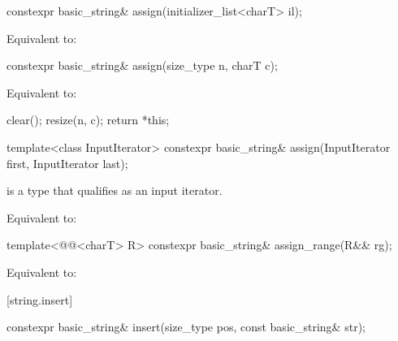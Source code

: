 %
\begin{itemdecl}
constexpr basic_string& assign(initializer_list<charT> il);
\end{itemdecl}

\begin{itemdescr}
\pnum
\effects
Equivalent to: 
\end{itemdescr}

%
\begin{itemdecl}
constexpr basic_string& assign(size_type n, charT c);
\end{itemdecl}

\begin{itemdescr}
\pnum
\effects
Equivalent to:
\begin{codeblock}
clear();
resize(n, c);
return *this;
\end{codeblock}
\end{itemdescr}

%
\begin{itemdecl}
template<class InputIterator>
  constexpr basic_string& assign(InputIterator first, InputIterator last);
\end{itemdecl}

\begin{itemdescr}
\pnum
\constraints
{} is a type that qualifies as an input
iterator.

\pnum
\effects
Equivalent to: 
\end{itemdescr}

%
\begin{itemdecl}
template<@@<charT> R>
  constexpr basic_string& assign_range(R&& rg);
\end{itemdecl}

\begin{itemdescr}
\pnum
\effects
Equivalent to: 
\end{itemdescr}

[string.insert]{}

%
\begin{itemdecl}
constexpr basic_string& insert(size_type pos, const basic_string& str);
\end{itemdecl}

